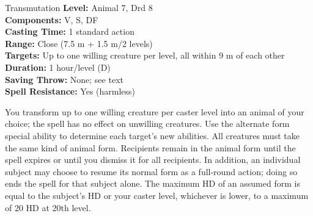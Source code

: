 {Transmutation}
{
	\textbf{Level:}
	Animal 7, Drd 8\\
	\textbf{Components:}
	V, S, DF\\
	\textbf{Casting Time:}
	1 standard action\\
	\textbf{Range:}
	Close (7.5 m + 1.5 m/2 levels)\\
	\textbf{Targets:}
	Up to one willing creature per level, all within 9 m of each other\\
	\textbf{Duration:}
	1 hour/level (D)\\
	\textbf{Saving Throw:}
	None; see text\\
	\textbf{Spell Resistance:}
	Yes (harmless)\\
}
{
	You transform up to one willing creature per caster level into an animal of your choice; the spell has no effect on unwilling creatures. Use the alternate form special ability to determine each target's new abilities. All creatures must take the same kind of animal form. Recipients remain in the animal form until the spell expires or until you dismiss it for all recipients. In addition, an individual subject may choose to resume its normal form as a full-round action; doing so ends the spell for that subject alone. The maximum HD of an assumed form is equal to the subject's HD or your caster level, whichever is lower, to a maximum of 20 HD at 20th level.

}
